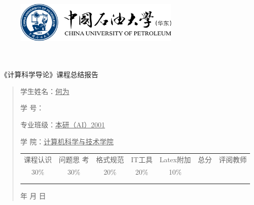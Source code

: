 \documentclass{article}
\renewcommand{\today}{\number\year 年 \number\month 月 \number\day 日}
\begin{document}
\begin{figure}
    \centering
    \includegraphics[width=8cm]{upc.png}

    \label{figupc}
\end{figure}

	\begin{center}
		\quad \\
		\quad \\
		\heiti \fontsize{45}{17} \quad \quad \quad 
		\vskip 1.5cm
		\heiti {} 《计算科学导论》课程总结报告
	\end{center}
	\vskip 2.0cm
		
	\begin{quotation}
		\doublespacing
		
        \par\setlength\parindent{7em}
		\quad 

		学生姓名：\underline{\qquad  何为 \qquad \qquad}

		学\hspace{0.61cm} 号：\underline{\qquad}
		
		专业班级：\underline{\qquad 本研（AI）2001 \qquad  }
		
        学\hspace{0.61cm} 院：\underline{计算机科学与技术学院}
		\vskip 2cm
		\centering
		\begin{table}[h]
            \centering 
            \begin{tabular}{|c|c|c|c|c|c|c|}
                \hline
                课程认识 & 问题思 考 & 格式规范  & IT工具  & Latex附加  & 总分 & 评阅教师 \\
                30\% & 30\% & 20\% & 20\% & 10\% &  &  \\
                \hline
                 & & & & & &\\
                & & & & & &\\
                \hline
            \end{tabular}
        \end{table}
		\vskip 2cm
		\today
	\end{quotation}
\end{document}
